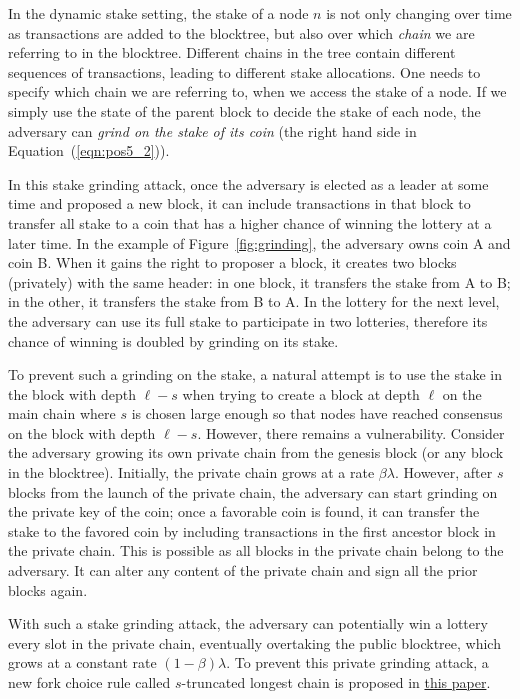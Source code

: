 \documentclass{article}
\begin{document}
In the dynamic stake setting, the stake of a node $n$ is not only changing over time  as transactions are added to the blocktree, but also over which {\em chain} we are referring to in the blocktree. Different chains in the tree contain different sequences of transactions, leading to different stake allocations. One needs to specify which chain we are referring to, when we access the stake of a node. If we simply use the state of the parent block to decide the stake of each node, the adversary can {\em grind on the stake of its coin} (the right hand side in Equation~(\ref{eqn:pos5_2})).

In this stake grinding attack, once the adversary is elected as a leader at some time and proposed a new block, it can include transactions in that block to transfer all stake to a coin that has a higher chance of winning the lottery at a later time. In the example of Figure~\ref{fig:grinding}, the adversary owns coin A and coin B. When it gains the right to proposer a block, it creates two blocks (privately) with the same header: in one block, it transfers the stake from A to B; in the other, it transfers the stake from B to A. In the lottery for the next level, the adversary can use its full stake to participate in two lotteries, therefore its chance of winning is doubled by grinding on its stake.

To prevent such a grinding on the stake, a natural attempt is to use the stake in the block with depth $\ell-s$ when trying to create a block at depth $\ell$ on the main chain where $s$ is chosen large enough so that nodes have reached consensus on the block with depth $\ell-s$. However, there remains  a vulnerability. Consider the adversary growing its own private chain from the genesis block (or any block in the blocktree). Initially, the private chain grows at a rate $\beta\lambda$.
However, after $s$ blocks from the launch of the private chain, the adversary can start grinding on the private key of the coin; once a favorable coin is found, it can transfer the stake to the favored coin by including transactions in the first ancestor block in the private chain. This is possible as all blocks in the private chain belong to the adversary. It can alter any content of the private chain and sign all the prior blocks again.

With such a stake grinding attack, the adversary can potentially win a lottery every slot in the private chain, eventually overtaking the public blocktree, which grows at a constant rate $(1-\beta)\lambda$. To prevent this private grinding attack, a new fork choice rule called $s$-truncated longest chain is proposed in \href{https://eprint.iacr.org/2018/378.pdf}{this paper}.
\end{document}
